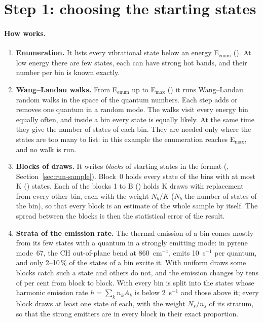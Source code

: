 \section{Step 1: choosing the starting states}\label{sec:thermal-sample}

\paragraph{How  works.}
\begin{enumerate}
\item \textbf{Enumeration.} It lists every vibrational state below an
energy E$_\mathrm{enum}$ (). At low energy there are few
states, each can have strong hot bands, and their number per bin is known
exactly.
\item \textbf{Wang--Landau walks.} From E$_\mathrm{enum}$ up to E$_\mathrm{max}$
() it runs Wang--Landau random walks in the space of the
quantum numbers. Each step adds or removes one quantum in a random mode.
The walks visit every energy bin equally often, and inside a bin every
state is equally likely. At the same time they give the number of states
of each bin. They are needed only where the states are too many to list:
in this example the enumeration reaches E$_\mathrm{max}$, and no walk is
run.
\item \textbf{Blocks of draws.} It writes \emph{blocks} of starting
states in the  format (,
Section~\ref{sec:run-sample}). Block~0 holds every state of the bins
with at most K () states. Each of the blocks
1 to B () holds K draws with replacement from every
other bin, each with the weight $N_b/K$ ($N_b$ the number of states of
the bin), so that every block is an estimate of the whole sample by
itself. The spread between the blocks is then the statistical error of
the result.
\item \textbf{Strata of the emission rate.} The thermal emission of a bin
comes mostly from its few states with a quantum in a strongly emitting
mode: in pyrene mode~67, the CH out-of-plane bend at 860~cm$^{-1}$, emits
10~s$^{-1}$ per quantum, and only 2--10\,\% of the states of a bin
excite it. With uniform draws some blocks catch such a state and others
do not, and the emission changes by tens of per cent from block to
block. With  every bin is split into the states whose
harmonic emission rate $h=\sum_k n_kA_k$ is below 2~s$^{-1}$ and those
above it; every block draws at least one state of each, with the weight
$N_s/n_s$ of its stratum, so that the strong emitters are in every block
in their exact proportion.
\end{enumerate}

